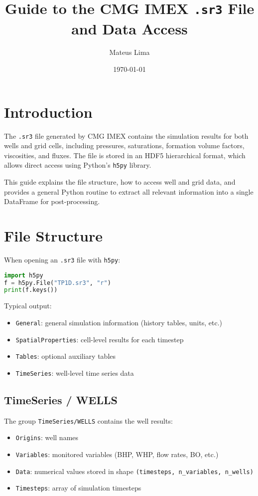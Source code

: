 \documentclass[12pt,a4paper]{article}
\title{Guide to the CMG IMEX \texttt{.sr3} File and Data Access}
\author{Mateus Lima}
\date{\today}
\begin{document}
\maketitle

\section{Introduction}

The \texttt{.sr3} file generated by CMG IMEX contains the simulation results for both wells and grid cells, including pressures, saturations, formation volume factors, viscosities, and fluxes. The file is stored in an HDF5 hierarchical format, which allows direct access using Python's \texttt{h5py} library.

This guide explains the file structure, how to access well and grid data, and provides a general Python routine to extract all relevant information into a single DataFrame for post-processing.

\section{File Structure}

When opening an \texttt{.sr3} file with \texttt{h5py}:

\begin{lstlisting}[language=Python]
import h5py
f = h5py.File("TP1D.sr3", "r")
print(f.keys())
\end{lstlisting}

Typical output:

\begin{itemize}
    \item \texttt{General}: general simulation information (history tables, units, etc.)
    \item \texttt{SpatialProperties}: cell-level results for each timestep
    \item \texttt{Tables}: optional auxiliary tables
    \item \texttt{TimeSeries}: well-level time series data
\end{itemize}

\subsection{TimeSeries / WELLS}

The group \texttt{TimeSeries/WELLS} contains the well results:

\begin{itemize}
    \item \texttt{Origins}: well names
    \item \texttt{Variables}: monitored variables (BHP, WHP, flow rates, BO, etc.)
    \item \texttt{Data}: numerical values stored in shape \texttt{(timesteps, n\_variables, n\_wells)}
    \item \texttt{Timesteps}: array of simulation timesteps
\end{itemize}
\end{document}

